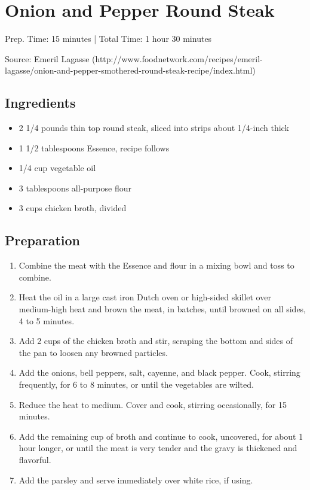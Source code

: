 \section{Onion and Pepper Round Steak}

Prep. Time: 15 minutes |
Total Time: 1 hour 30 minutes 

\noindent Source: Emeril Lagasse (http://www.foodnetwork.com/recipes/emeril-lagasse/onion-and-pepper-smothered-round-steak-recipe/index.html)

\subsection{Ingredients}
\begin{itemize}
    \item 2 1/4 pounds thin top round steak, sliced into strips about 1/4-inch thick
    \item 1 1/2 tablespoons Essence, recipe follows
    \item 1/4 cup vegetable oil
    \item 3 tablespoons all-purpose flour
    \item 3 cups chicken broth, divided
\end{itemize}

\subsection{Preparation}
\begin{enumerate}
    \item Combine the meat with the Essence and flour in a mixing bowl and toss to combine.
    \item Heat the oil in a large cast iron Dutch oven or high-sided skillet over medium-high heat and brown the meat, in batches, until browned on all sides, 4 to 5 minutes.
    \item Add 2 cups of the chicken broth and stir, scraping the bottom and sides of the pan to loosen any browned particles.
    \item Add the onions, bell peppers, salt, cayenne, and black pepper. Cook, stirring frequently, for 6 to 8 minutes, or until the vegetables are wilted.
    \item Reduce the heat to medium. Cover and cook, stirring occasionally, for 15 minutes.
    \item Add the remaining cup of broth and continue to cook, uncovered, for about 1 hour longer, or until the meat is very tender and the gravy is thickened and flavorful.
    \item Add the parsley and serve immediately over white rice, if using.
\end{enumerate}

